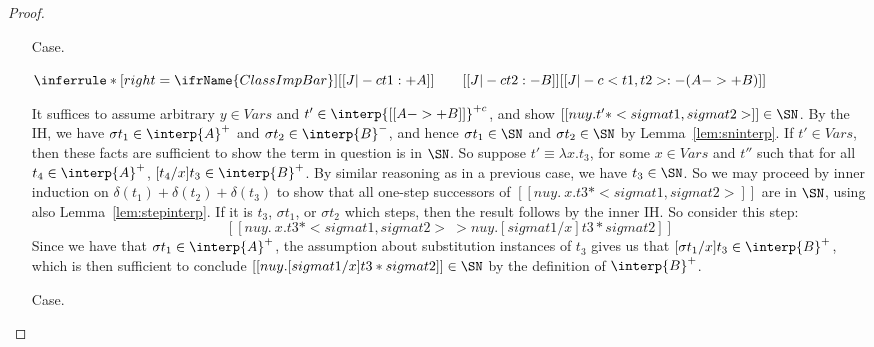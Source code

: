 \begin{proof}
\begin{itemize}
\item[Case.]\ 

\vspace{-.2cm}
\begin{center}
\begin{math}
\inferrule* [right=\ifrName{ClassImpBar}] {[[J |-c t1 : + A]]  \qquad [[ J |-c t2 : - B ]]}{[[ J |-c < t1 , t2 > : - (A ->+ B) ]]}
\end{math}
\end{center}
It suffices to assume arbitrary $y\in\textit{Vars}$ and
$t'\in\interp{[[A ->+ B]]}^{+c}$, and show $[[nu y. t' * < sigma t1 ,
sigma t2 >]]\in\SN$.  By the IH, we have $\sigma t_1\in\interp{A}^+$
and $\sigma t_2\in\interp{B}^-$, and hence $\sigma t_1\in\SN$ and
$\sigma t_2\in\SN$ by Lemma~\ref{lem:sninterp}.  If
$t'\in\textit{Vars}$, then these facts are sufficient to show the term
in question is in $\SN$.  So suppose $t'\equiv \lambda x.t_3$, for
some $x\in\textit{Vars}$ and $t''$ such that for all
$t_4\in\interp{A}^+$, $[t_4/x]t_3\in\interp{B}^+$.  By similar
reasoning as in a previous case, we have $t_3\in\SN$.  So we may
proceed by inner induction on $\delta(t_1)+\delta(t_2)+\delta(t_3)$ to
show that all one-step successors of $[[nu y. \ x . t3 * < sigma t1 ,
sigma t2 >]]$ are in $\SN$, using also Lemma~\ref{lem:stepinterp}.  If
it is $t_3$, $\sigma t_1$, or $\sigma t_2$ which steps, then the
result follows by the inner IH.  So consider this step:
\[
[[nu y. \ x . t3 * < sigma t1 , sigma t2 >  ~>  nu y . [sigma t1 / x] t3 * sigma t2]]
\]
Since we have that $\sigma t_1\in\interp{A}^+$, the assumption about substitution
instances of $t_3$ gives us that $[\sigma t_1/x]t_3\in\interp{B}^+$, which is
then sufficient to conclude $[[nu y . [sigma t1 / x] t3 * sigma t2]]\in\SN$
by the definition of $\interp{B}^+$.

\item[Case.]\ 


\end{itemize}
\end{proof}

